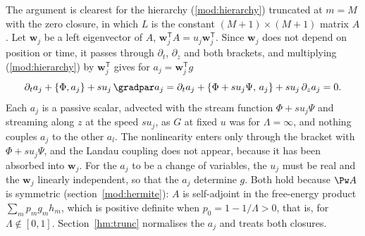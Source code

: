 The argument is clearest for the hierarchy (\ref{mod:hierarchy}) truncated at $m=M$ with the zero closure, in which $L$ is the constant $(M+1)\times(M+1)$ matrix $A$. Let $\boldsymbol w_j$ be a left eigenvector of $A$, $\boldsymbol w_j^{\mathsf T}A=u_j\boldsymbol w_j^{\mathsf T}$. Since $\boldsymbol w_j$ does not depend on position or time, it passes through $\partial_t$, $\partial_z$ and both brackets, and multiplying (\ref{mod:hierarchy}) by $\boldsymbol w_j^{\mathsf T}$ gives for $a_j=\boldsymbol w_j^{\mathsf T}g$
\begin{equation*}
  \partial_ta_j+\{\Phi,a_j\}+su_j\,\gradpar a_j
  =\partial_ta_j+\{\Phi+su_j\Psi,\,a_j\}+su_j\,\partial_za_j=0 .
\end{equation*}
Each $a_j$ is a passive scalar, advected with the stream function $\Phi+su_j\Psi$ and streaming along $z$ at the speed $su_j$, as $G$ at fixed $u$ was for $\Lambda=\infty$, and nothing couples $a_j$ to the other $a_l$. The nonlinearity enters only through the bracket with $\Phi+su_j\Psi$, and the Landau coupling does not appear, because it has been absorbed into $\boldsymbol w_j$. For the $a_j$ to be a change of variables, the $u_j$ must be real and the $\boldsymbol w_j$ linearly independent, so that the $a_j$ determine $g$. Both hold because $\Pw A$ is symmetric (section~\ref{mod:hermite}): $A$ is self-adjoint in the free-energy product $\sum_mp_mg_mh_m$, which is positive definite when $p_0=1-1/\Lambda>0$, that is, for $\Lambda\notin[0,1]$. Section~\ref{hm:trunc} normalises the $a_j$ and treats both closures.


